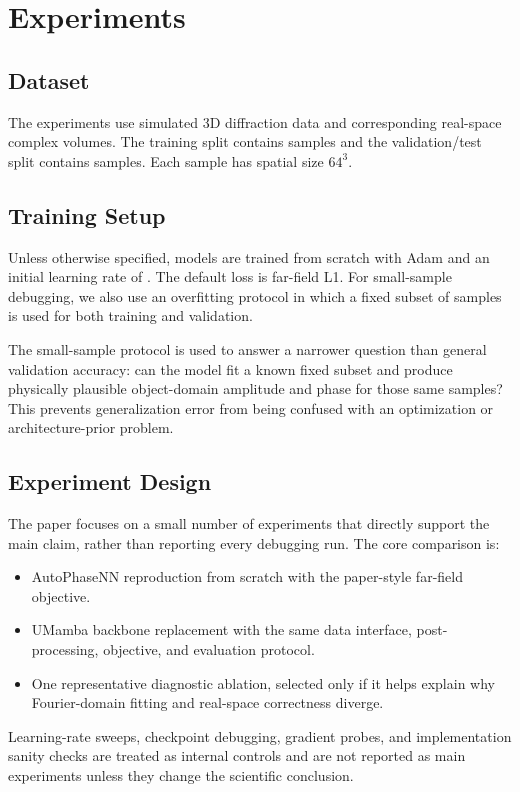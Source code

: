 \section{Experiments}

\subsection{Dataset}
The experiments use simulated 3D diffraction data and corresponding real-space
complex volumes. The training split contains  samples and the
validation/test split contains  samples. Each sample has spatial
size $64^3$.

\subsection{Training Setup}
Unless otherwise specified, models are trained from scratch with Adam and an
initial learning rate of . The default loss is far-field L1.
For small-sample debugging, we also use an overfitting protocol in which a fixed
subset of samples is used for both training and validation.

The small-sample protocol is used to answer a narrower question than general
validation accuracy: can the model fit a known fixed subset and produce
physically plausible object-domain amplitude and phase for those same samples?
This prevents generalization error from being confused with an optimization or
architecture-prior problem.

\subsection{Experiment Design}
The paper focuses on a small number of experiments that directly support the
main claim, rather than reporting every debugging run. The core comparison is:
\begin{itemize}
  \item AutoPhaseNN reproduction from scratch with the paper-style far-field
  objective.
  \item UMamba backbone replacement with the same data interface,
  post-processing, objective, and evaluation protocol.
  \item One representative diagnostic ablation, selected only if it helps
  explain why Fourier-domain fitting and real-space correctness diverge.
\end{itemize}
Learning-rate sweeps, checkpoint debugging, gradient probes, and implementation
sanity checks are treated as internal controls and are not reported as main
experiments unless they change the scientific conclusion.

